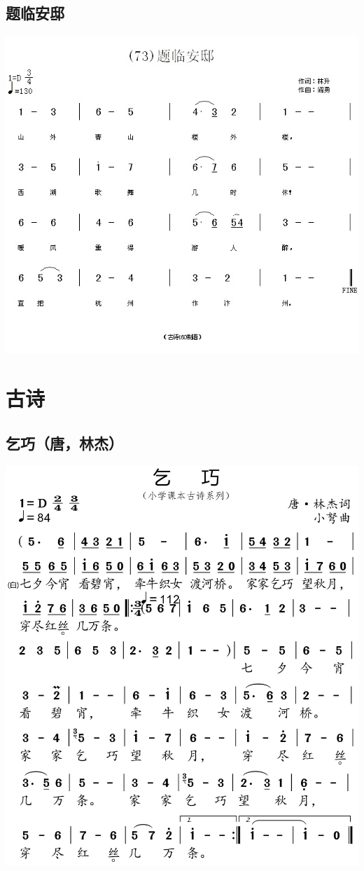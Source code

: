 \documentclass[cn,pad,twocol]{elegantbook}
\begin{document}
\section{题临安邸}  \includegraphics[width=\textwidth]{dongxiao/20200808-题临安邸-陆游.jpg}                             
 
\chapter{古诗}
\section{乞巧（唐，林杰）}      \includegraphics[width=\textwidth]{dongxiao/20200627-古诗-乞巧.jpg}     
\end{document}
